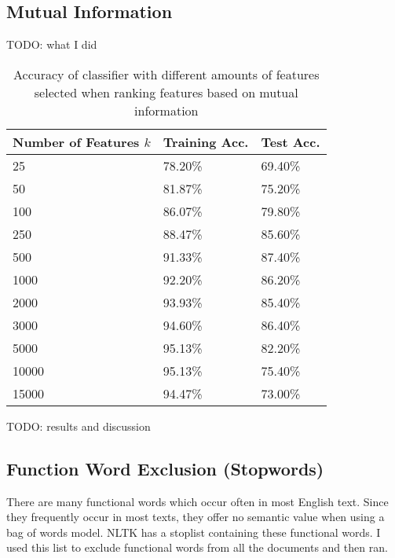 \documentclass{article}
\begin{document}
\subsection{Mutual Information}

TODO: what I did

\begin{table}
	\centering
	\begin{tabular}{|l|l|l|}
	\hline
	\textbf{Number of Features $k$} & \textbf{Training Acc.} & \textbf{Test Acc.} \\
	\hline
	25 & 78.20\% & 69.40\% \\
	50 & 81.87\% & 75.20\% \\
	100 & 86.07\% & 79.80\% \\
	250 & 88.47\% & 85.60\% \\
	500 & 91.33\% & 87.40\% \\
	1000 & 92.20\% & 86.20\% \\
	2000 & 93.93\% & 85.40\% \\
	3000 & 94.60\% & 86.40\% \\
	5000 & 95.13\% & 82.20\% \\
	10000 & 95.13\% & 75.40\% \\
	15000 & 94.47\% & 73.00\% \\
	\hline
	\end{tabular}
	\caption{Accuracy of classifier with different amounts of features selected when ranking features based on mutual information}
	\label{tab:mutual_information}
\end{table}

TODO: results and discussion

\subsection{Function Word Exclusion (Stopwords)}

There are many functional words which occur often in most English text. Since they frequently occur in most texts, they offer no semantic value when using a bag of words model. NLTK has a stoplist containing these functional words. I used this list to exclude functional words from all the documents and then ran.
\end{document}
